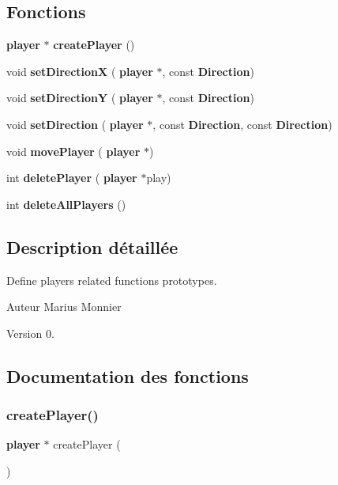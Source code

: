 \subsection*{Fonctions}
\begin{DoxyCompactItemize}
\item 
\textbf{ player} $\ast$ \textbf{ create\+Player} ()
\item 
\mbox{\label{players_8h_aee97302da473b6f7f4f27926d73abb3d}} 
void {\bfseries set\+DirectionX} (\textbf{ player} $\ast$, const \textbf{ Direction})
\item 
\mbox{\label{players_8h_a16ad2824483db11ccb9602acb5e1ac29}} 
void {\bfseries set\+DirectionY} (\textbf{ player} $\ast$, const \textbf{ Direction})
\item 
\mbox{\label{players_8h_a99eb8726cbcfd95c0634027792344069}} 
void {\bfseries set\+Direction} (\textbf{ player} $\ast$, const \textbf{ Direction}, const \textbf{ Direction})
\item 
\mbox{\label{players_8h_a26832b35489278e57f5fd92bfaf89216}} 
void {\bfseries move\+Player} (\textbf{ player} $\ast$)
\item 
\mbox{\label{players_8h_a8ceebefb9c41af5ee039bd4df9119f92}} 
int {\bfseries delete\+Player} (\textbf{ player} $\ast$play)
\item 
\mbox{\label{players_8h_a8bdc5cc263575cf5cf97c08e8d596293}} 
int {\bfseries delete\+All\+Players} ()
\end{DoxyCompactItemize}


\subsection{Description détaillée}
Define players related functions prototypes. 

\begin{DoxyAuthor}{Auteur}
Marius Monnier 
\end{DoxyAuthor}
\begin{DoxyVersion}{Version}
0. 
\end{DoxyVersion}


\subsection{Documentation des fonctions}
\mbox{\label{players_8h_a62a16a32a68ba4359f95213cd4e39e85}} 
\subsubsection{create\+Player()}
{\footnotesize\ttfamily \textbf{ player} $\ast$ create\+Player (\begin{DoxyParamCaption}{ }\end{DoxyParamCaption})}



